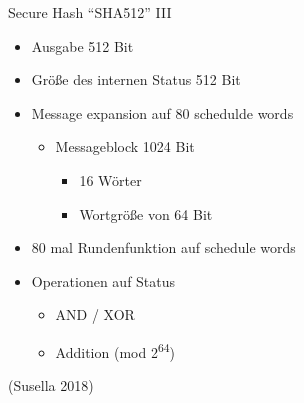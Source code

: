 \begin{frame}{Secure Hash ``SHA512'' III}
\protect\hypertarget{secure-hash-sha512-iii}{}
\begin{itemize}
\tightlist
\item
  Ausgabe 512 Bit
\end{itemize}

\pause

\begin{itemize}
\tightlist
\item
  Größe des internen Status 512 Bit
\end{itemize}

\pause

\begin{itemize}
\item
  Message expansion auf 80 schedulde words

  \pause

  \begin{itemize}
  \item
    Messageblock 1024 Bit

    \pause

    \begin{itemize}
    \tightlist
    \item
      16 Wörter
    \end{itemize}

    \pause

    \begin{itemize}
    \tightlist
    \item
      Wortgröße von 64 Bit
    \end{itemize}
  \end{itemize}
\item
  80 mal Rundenfunktion auf schedule words
\end{itemize}

\pause

\begin{itemize}
\tightlist
\item
  Operationen auf Status

  \begin{itemize}
  \tightlist
  \item
    AND / XOR
  \item
    Addition (mod 2\textsuperscript{64})
  \end{itemize}
\end{itemize}

(Susella 2018)
\end{frame}

